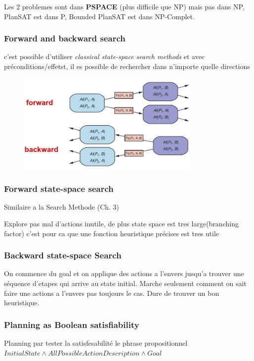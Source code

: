 \documentclass[12pt]{article}
\begin{document}
			Les 2 problemes sont dans \textbf{PSPACE} (plus difficile que NP) mais pas dans NP, PlanSAT est dans P, Bounded PlanSAT est dans NP-Complet.
			
		\subsubsection{Forward and backward search}
			c'est possible d'utiliser \textit{classical state-space search methods} et avec préconditions/effetst, il es possible de rechercher dans n'importe quelle directions
			
			\begin{figure}[htp]	
				\centering
				\includegraphics[width=0.8\textwidth]{img/FBSearch.png}
			\end{figure}
			
		\subsubsection{Forward state-space search}
			Similaire a la Search Methode (Ch. 3)
			
			Explore pas mal d'actions inutile, de plus state space est tres large(branching factor) c'est pour ca que une fonction heuristique précises est tres utile
			
		\subsubsection{Backward state-space Search}
			On commence du goal et on applique des actions a l'envers jusqu'a trouver une séquence d'etapes qui arrive au state initial. Marche seulement comment on sait faire une actions a l'envers pas toujours le cas. Dure de trouver un bon heuristique.
			
		\subsubsection{Planning as Boolean satisfiability}
			Planning par tester la satisfesabilité le phrase propositionnel $InitialState \land AllPossibleActionDescription \land Goal$
			
\end{document}

